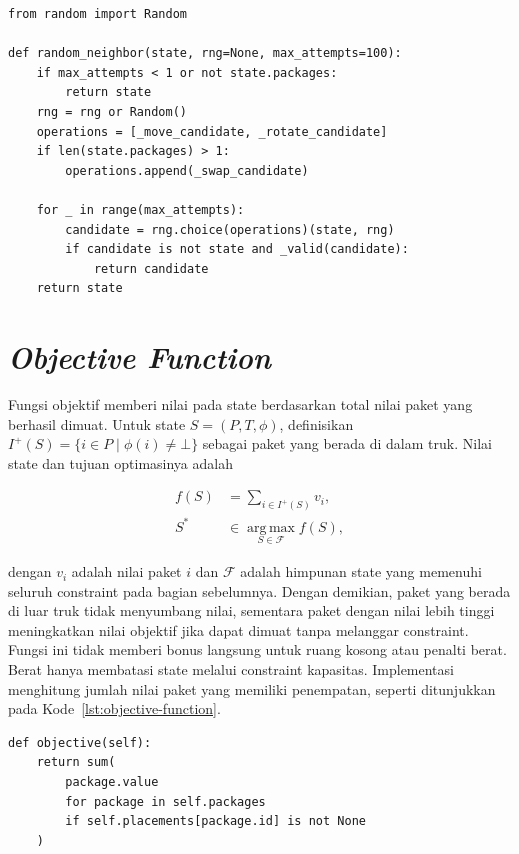 \begin{lstlisting}[caption={Pemilihan kandidat suksesor yang valid},label={lst:random-neighbor}]
from random import Random

def random_neighbor(state, rng=None, max_attempts=100):
    if max_attempts < 1 or not state.packages:
        return state
    rng = rng or Random()
    operations = [_move_candidate, _rotate_candidate]
    if len(state.packages) > 1:
        operations.append(_swap_candidate)

    for _ in range(max_attempts):
        candidate = rng.choice(operations)(state, rng)
        if candidate is not state and _valid(candidate):
            return candidate
    return state
\end{lstlisting}

\section{\textit{Objective Function}}

Fungsi objektif memberi nilai pada state berdasarkan total nilai paket yang berhasil dimuat. Untuk state $S=(P,T,\phi)$, definisikan $I^+(S)=\{i\in P\mid\phi(i)\neq\bot\}$ sebagai paket yang berada di dalam truk. Nilai state dan tujuan optimasinya adalah

\begin{align}
    f(S) & = \sum_{i\in I^+(S)} v_i,
    \label{eq:objective-value}                                  \\
    S^*  & \in \operatorname*{arg\,max}_{S\in\mathcal{F}} f(S),
    \label{eq:objective-max}
\end{align}

dengan $v_i$ adalah nilai paket $i$ dan $\mathcal{F}$ adalah himpunan state yang memenuhi seluruh constraint pada bagian sebelumnya. Dengan demikian, paket yang berada di luar truk tidak menyumbang nilai, sementara paket dengan nilai lebih tinggi meningkatkan nilai objektif jika dapat dimuat tanpa melanggar constraint. Fungsi ini tidak memberi bonus langsung untuk ruang kosong atau penalti berat. Berat hanya membatasi state melalui constraint kapasitas. Implementasi menghitung jumlah nilai paket yang memiliki penempatan, seperti ditunjukkan pada Kode~\ref{lst:objective-function}.

\begin{lstlisting}[caption={Perhitungan nilai objektif sebuah state},label={lst:objective-function}]
def objective(self):
    return sum(
        package.value
        for package in self.packages
        if self.placements[package.id] is not None
    )
\end{lstlisting}


